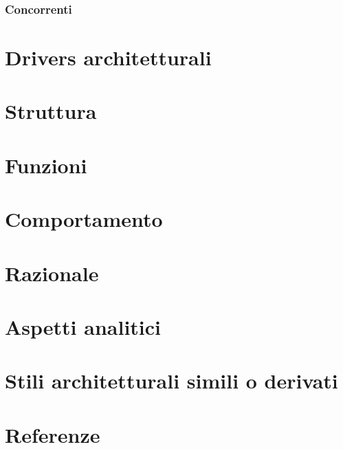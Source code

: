 \documentclass[12pt, a4paper]{report}
\begin{document}
\subsection{Concorrenti}
\chapter{Drivers architetturali}
\chapter{Struttura}
\chapter{Funzioni}
\chapter{Comportamento}
\chapter{Razionale}
\chapter{Aspetti analitici}
\chapter{Stili architetturali simili o derivati}
\chapter{Referenze}
\end{document}
